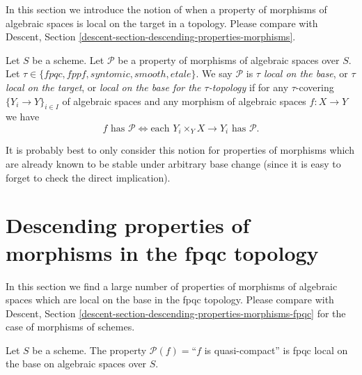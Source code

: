 \noindent
In this section we introduce the notion of when a property of morphisms of
algebraic spaces is local on the target in a topology. Please compare with
Descent, Section \ref{descent-section-descending-properties-morphisms}.

\begin{definition}
\label{definition-property-morphisms-local}
Let $S$ be a scheme.
Let $\mathcal{P}$ be a property of morphisms of algebraic spaces over $S$.
Let $\tau \in \{fpqc, fppf, syntomic, smooth, etale\}$.
We say $\mathcal{P}$ is {\it $\tau$ local on the base}, or
{\it $\tau$ local on the target}, or
{\it local on the base for the $\tau$-topology} if for any
$\tau$-covering $\{Y_i \to Y\}_{i \in I}$ of algebraic spaces
and any morphism of algebraic spaces $f : X \to Y$ we 
have
$$
f \text{ has }\mathcal{P}
\Leftrightarrow
\text{each }Y_i \times_Y X \to Y_i\text{ has }\mathcal{P}.
$$
\end{definition}

\noindent
It is probably best to only consider this notion for properties of morphisms
which are already known to be stable under arbitrary base change (since it is
easy to forget to check the direct implication).





\section{Descending properties of morphisms in the fpqc topology}
\label{section-descending-properties-morphisms-fpqc}


\noindent
In this section we find a large number of properties
of morphisms of algebraic spaces which are local on the base
in the fpqc topology. Please compare with
Descent, Section \ref{descent-section-descending-properties-morphisms-fpqc}
for the case of morphisms of schemes.

\begin{lemma}
\label{lemma-descending-property-quasi-compact}
Let $S$ be a scheme.
The property $\mathcal{P}(f) =$``$f$ is quasi-compact''
is fpqc local on the base on algebraic spaces over $S$.
\end{lemma}

